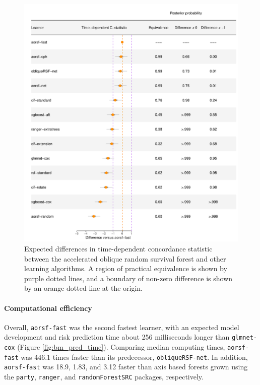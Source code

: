 \documentclass{article}\usepackage[]{graphicx}\usepackage[]{xcolor}
\makeatletter
\def\maxwidth{ %
  \ifdim\Gin@nat@width>\linewidth
    \linewidth
  \else
    \Gin@nat@width
  \fi
}
\newenvironment{knitrout}{}{} %
\makeatother
\begin{document}
\begin{knitrout}
\color{fgcolor}\begin{figure}
\includegraphics[width=\maxwidth]{figure/bm_pred_model_viz_cstat-1} \caption[Expected differences in time-dependent concordance statistic between the accelerated oblique random survival forest and other learning algorithms]{Expected differences in time-dependent concordance statistic between the accelerated oblique random survival forest and other learning algorithms. A region of practical equivalence is shown by purple dotted lines, and a boundary of non-zero difference is shown by an orange dotted line at the origin.}\label{fig:bm_pred_model_viz_cstat}
\end{figure}

\end{knitrout}




\paragraph{Computational efficiency}

Overall, \texttt{aorsf-fast} was the second fastest learner, with an expected model development and risk prediction time about 256 milliseconds longer than \texttt{glmnet-cox} (Figure \ref{fig:bm_pred_time}). Comparing median computing times, \texttt{aorsf-fast} was 446.1 times faster than its predecessor, \texttt{obliqueRSF-net}. In addition, \texttt{aorsf-fast} was 18.9, 1.83, and 3.12 faster than axis based forests grown using the \texttt{party}, \texttt{ranger}, and \texttt{randomForestSRC} packages, respectively.
\end{document}
